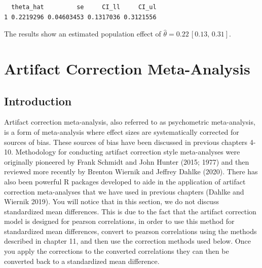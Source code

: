 \documentclass[
  letterpaper,
  DIV=11,
  numbers=noendperiod]{scrreprt}
\newenvironment{Shaded}{}{}
\newcommand{\AttributeTok}[1]{\textcolor[rgb]{0.00,0.34,0.68}{#1}}
\newcommand{\CommentTok}[1]{\textcolor[rgb]{0.54,0.53,0.53}{#1}}
\newcommand{\DecValTok}[1]{\textcolor[rgb]{0.69,0.50,0.00}{#1}}
\newcommand{\FunctionTok}[1]{\textcolor[rgb]{0.39,0.29,0.61}{#1}}
\newcommand{\NormalTok}[1]{\textcolor[rgb]{0.12,0.11,0.11}{#1}}
\newcommand{\SpecialCharTok}[1]{\textcolor[rgb]{0.24,0.68,0.91}{#1}}
\begin{document}
\begin{tcolorbox}
\begin{Shaded}
\end{Shaded}

\begin{verbatim}
  theta_hat         se     CI_ll     CI_ul
1 0.2219296 0.04603453 0.1317036 0.3121556
\end{verbatim}

The results show an estimated population effect of
\(\hat{\theta}=0.22\, [0.13,\, 0.31]\).

\end{tcolorbox}


\chapter{Artifact Correction Meta-Analysis}\label{sec-artifact}

\section{Introduction}\label{introduction-9}

Artifact correction meta-analysis, also referred to as psychometric
meta-analysis, is a form of meta-analysis where effect sizes are
systematically corrected for sources of bias. These sources of bias have
been discussed in previous chapters 4-10. Methodology for conducting
artifact correction style meta-analyses were originally pioneered by
Frank Schmidt and John Hunter (2015; 1977) and then reviewed more
recently by Brenton Wiernik and Jeffrey Dahlke (2020). There has also
been powerful R packages developed to aide in the application of
artifact correction meta-analyses that we have used in previous chapters
(Dahlke and Wiernik 2019). You will notice that in this section, we do
not discuss standardized mean differences. This is due to the fact that
the artifact correction model is designed for pearson correlations, in
order to use this method for standardized mean differences, convert to
pearson correlations using the methods described in chapter 11, and then
use the correction methods used below. Once you apply the corrections to
the converted correlations they can then be converted back to a
standardized mean difference.
\end{document}
